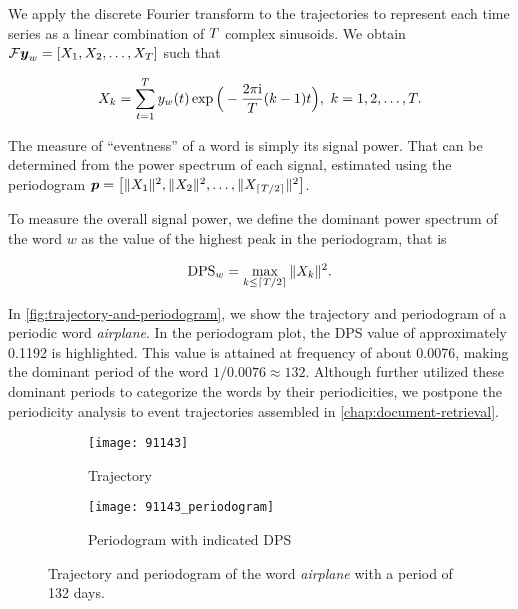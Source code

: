 We apply the discrete Fourier transform to the trajectories to represent each time series as a linear combination of $T$ complex sinusoids. We obtain $\mathcal{F} \vect{\traj}_{w} = \left[ X_{1}, X_{2}, \dots, X_{\streamlen}\right ]$ such that

\begin{equation}
	X_{k} = \sum_{t = 1}^{T}{y_{w}(t) \exp \Big(- \frac{2 \pi \mathrm{i}}{T} (k - 1) t} \Big), ~ k = 1, 2, \dots, T.
\end{equation}

The measure of ``eventness'' of a word is simply its signal power. That can be determined from the power spectrum of each signal, estimated using the periodogram $\vect{P} = \left[ \|X_{1}\|^{2}, \|X_{2}\|^{2}, \dots, \|X_{\ceil{\streamlen / 2}}\|^{2} \right]$.

To measure the overall signal power, we define the dominant power spectrum of the word $w$ as the value of the highest peak in the periodogram, that is

\begin{equation}
	\text{DPS}_{w} = \max\limits_{k \leq \lceil T / 2\rceil}{\|X_{k}\|^{2}}.
\end{equation}

In \autoref{fig:trajectory-and-periodogram}, we show the trajectory and periodogram of a periodic word \textit{airplane}. In the periodogram plot, the DPS value of approximately 0.1192 is highlighted. This value is attained at frequency of about 0.0076, making the dominant period of the word $1/0.0076 \approx 132$. Although \cite{event-detection} further utilized these dominant periods to categorize the words by their periodicities, we postpone the periodicity analysis to event trajectories assembled in \autoref{chap:document-retrieval}.

\begin{figure}[H]
\centering
\begin{subfigure}{.5\textwidth}
  \centering
  \texttt{[image: 91143]}  %
  \caption{Trajectory}
  \label{fig:letadlo}
\end{subfigure}%
\begin{subfigure}{.5\textwidth}
  \centering
  \texttt{[image: 91143\_periodogram]}  %
  \caption{Periodogram with indicated DPS}
  \label{fig:letadlo-periodogram}
\end{subfigure}
\caption{Trajectory and periodogram of the word \textit{airplane} with a period of 132 days.}
\label{fig:trajectory-and-periodogram}
\end{figure}


